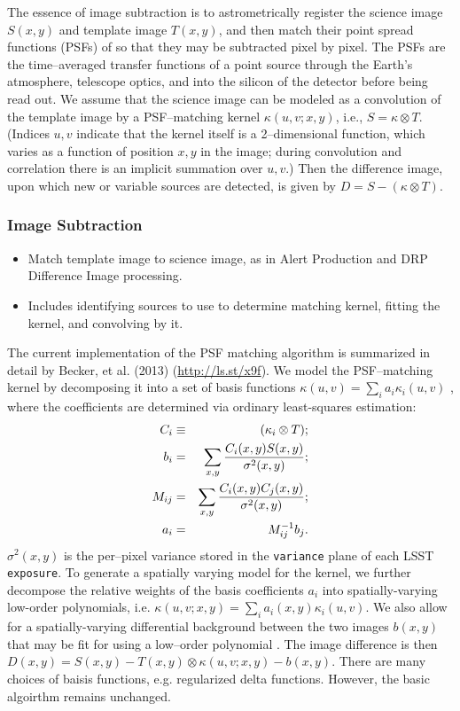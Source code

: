 The essence of image subtraction is to astrometrically register the science image $S(x,y)$ and template image $T(x,y)$, and then match their point spread functions (PSFs) of so that they may be subtracted pixel by pixel. The PSFs are the time--averaged transfer functions of a point source through the Earth's atmosphere, telescope optics, and into the silicon of the detector before being read out. We assume that the science image can be modeled as a convolution of the template image by a PSF--matching kernel $\kappa(u,v;x,y)$, i.e., $S = \kappa \otimes T$. (Indices $u,v$ indicate that the kernel itself is a 2--dimensional function, which varies as a function of position $x,y$ in the image; during convolution and correlation there is an implicit summation over $u,v$.) Then the difference image, upon which new or variable sources are detected, is given by $D = S - (\kappa \otimes T)$. 

\subsubsection{Image Subtraction}
\label{sec:acImageSubtraction}
\begin{itemize}
\item Match template image to science image, as in Alert Production and DRP Difference Image processing.
\item Includes identifying sources to use to determine matching kernel, fitting the kernel, and convolving by it.
\end{itemize}

The current implementation of the PSF matching algorithm is summarized in detail by Becker, et al. (2013) (\url{http://ls.st/x9f}).  We model the PSF--matching kernel by decomposing it into a set of basis functions $\kappa(u,v) = \sum_i a_i \kappa_i(u,v)$ \citep{Alard98}, where the coefficients are determined via ordinary least-squares estimation:
%
\begin{eqnarray}
C_i & \equiv & (\kappa_i \otimes T); \\ \nonumber
b_{i}  & = & \sum_{x,y} {{C_i(x,y) S(x,y)}\over{\sigma^2(x,y)}};   \nonumber \\ 
M_{ij} & = & \sum_{x,y} {{C_i(x,y) C_j(x,y)}\over{\sigma^2(x,y)}};  \nonumber \\ 
a_{i}  & = & M^{-1}_{ij} b_{j}. \nonumber 
\label{eq-soln}
\end{eqnarray}
%
\noindent
$\sigma^2(x,y)$ is the per--pixel variance stored in the {\tt   variance} plane of each LSST {\tt exposure}. To generate a spatially varying model for the kernel, we further decompose the relative weights of the basis coefficients $a_i$ into spatially-varying low-order polynomials, i.e. $\kappa(u,v;x,y) = \sum_i a_i(x,y) \kappa_i(u,v)$. We also allow for a spatially-varying differential background between the two images $b(x,y)$ that may be fit for using a low--order polynomial \citep{Alard98,Alard00}. The image difference is then $D(x,y) = S(x,y) - T(x,y) \otimes \kappa(u,v;x,y) - b(x,y)$.  There are many choices of baisis functions, e.g. regularized delta functions.  However, the basic algoirthm remains unchanged. 

